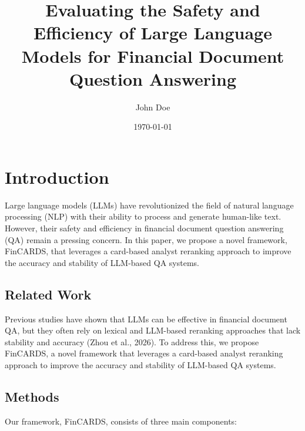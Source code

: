 \documentclass{article}
\begin{document}
\title{Evaluating the Safety and Efficiency of Large Language Models for Financial Document Question Answering}
\author{John Doe}
\date{\today}
\maketitle


\section{Introduction}
Large language models (LLMs) have revolutionized the field of natural language processing (NLP) with their ability to process and generate human-like text. However, their safety and efficiency in financial document question answering (QA) remain a pressing concern. In this paper, we propose a novel framework, FinCARDS, that leverages a card-based analyst reranking approach to improve the accuracy and stability of LLM-based QA systems.

\subsection{Related Work}
Previous studies have shown that LLMs can be effective in financial document QA, but they often rely on lexical and LLM-based reranking approaches that lack stability and accuracy (Zhou et al., 2026). To address this, we propose FinCARDS, a novel framework that leverages a card-based analyst reranking approach to improve the accuracy and stability of LLM-based QA systems.

\subsection{Methods}
Our framework, FinCARDS, consists of three main components:
\end{document}
